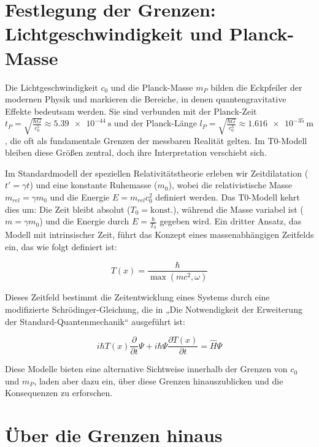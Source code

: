 \documentclass[a4paper,12pt]{article}
\newcommand{\Tfield}{T(x)}
\begin{document}
	\section{Festlegung der Grenzen: \\Lichtgeschwindigkeit und Planck-Masse}
	
	Die Lichtgeschwindigkeit \(c_0\) und die Planck-Masse \(m_P\) bilden die Eckpfeiler der modernen Physik und markieren die Bereiche, in denen quantengravitative Effekte bedeutsam werden. Sie sind verbunden mit der Planck-Zeit \(t_P = \sqrt{\frac{\hbar G}{c_0^5}} \approx \SI{5.39e-44}{\second}\) und der Planck-Länge \(l_P = \sqrt{\frac{\hbar G}{c_0^3}} \approx \SI{1.616e-35}{\meter}\), die oft als fundamentale Grenzen der messbaren Realität gelten. Im T0-Modell bleiben diese Größen zentral, doch ihre Interpretation verschiebt sich.
	
	Im Standardmodell der speziellen Relativitätstheorie erleben wir Zeitdilatation (\(t' = \gamma t\)) und eine konstante Ruhemasse (\(m_0\)), wobei die relativistische Masse \(m_{rel} = \gamma m_0\) und die Energie \(E = m_{rel} c_0^2\) definiert werden. Das T0-Modell kehrt dies um: Die Zeit bleibt absolut (\(T_0 = \text{konst.}\)), während die Masse variabel ist (\(m = \gamma m_0\)) und die Energie durch \(E = \frac{\hbar}{T_0}\) gegeben wird. Ein dritter Ansatz, das Modell mit intrinsischer Zeit, führt das Konzept eines massenabhängigen Zeitfelds ein, das wie folgt definiert ist:
	
	\begin{equation}
		\Tfield = \frac{\hbar}{\max(m c^2, \omega)}
	\end{equation}
	
	Dieses Zeitfeld bestimmt die Zeitentwicklung eines Systems durch eine modifizierte Schrödinger-Gleichung, die in „Die Notwendigkeit der Erweiterung der Standard-Quantenmechanik“ \cite{pascher_quantum_2025} ausgeführt ist:
	
	\begin{equation}
		i\hbar \Tfield \frac{\partial}{\partial t} \Psi + i\hbar \Psi \frac{\partial \Tfield}{\partial t} = \hat{H} \Psi
	\end{equation}
	
	Diese Modelle bieten eine alternative Sichtweise innerhalb der Grenzen von \(c_0\) und \(m_P\), laden aber dazu ein, über diese Grenzen hinauszublicken und die Konsequenzen zu erforschen.
	
	\section{Über die Grenzen hinaus}
	
\end{document}
